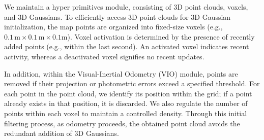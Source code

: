 \documentclass[lettersize,journal]{IEEEtran}
\begin{document}
We maintain a hyper primitives module, consisting of 3D point clouds, voxels, and 3D Gaussians. To efficiently access 3D point clouds for 3D Gaussian initialization, the map points are organized into fixed-size voxels (e.g., $0.1 \, \text{m} \times 0.1 \, \text{m} \times 0.1 \text{m}$). Voxel activation is determined by the presence of recently added points (e.g., within the last second). An activated voxel indicates recent activity, whereas a deactivated voxel signifies no recent updates.

In addition, within the Visual-Inertial Odometry (VIO) module, points are removed if their projection or photometric errors exceed a specified threshold\cite{r3live}. For each point in the point cloud, we identify its position within the grid; if a point already exists in that position, it is discarded. We also regulate the number of points within each voxel to maintain a controlled density. Through this initial filtering process, as odometry proceeds, the obtained point cloud avoids the redundant addition of 3D Gaussians.
\end{document}
